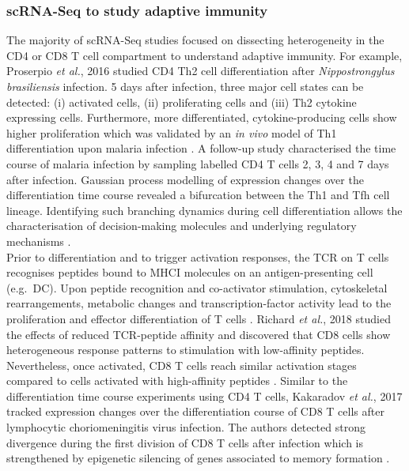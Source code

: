 \subsubsection{scRNA-Seq to study adaptive immunity}

The majority of scRNA-Seq studies focused on dissecting heterogeneity in the CD4\plus{} or CD8\plus{} T cell compartment to understand adaptive immunity. For example, Proserpio \emph{et al.}, 2016 studied CD4\plus{} Th2 cell differentiation after \textit{Nippostrongylus brasiliensis} infection. 5 days after infection, three major cell states can be detected: (i) activated cells, (ii) proliferating cells and (iii) Th2 cytokine expressing cells. Furthermore, more differentiated, cytokine-producing cells show higher proliferation which was validated by an \emph{in vivo} model of Th1 differentiation upon malaria infection \citep{Proserpio2016}. A follow-up study characterised the time course of malaria infection by sampling labelled CD4\plus{} T cells 2, 3, 4 and 7 days after infection. Gaussian process modelling of expression changes over the differentiation time course revealed a bifurcation between the Th1 and \gls{Tfh} cell lineage. Identifying such branching dynamics during cell differentiation allows the characterisation of decision-making molecules and underlying regulatory mechanisms \citep{Lonnberg2017}. \\

Prior to differentiation and to trigger activation responses, the \gls{TCR} on T cells recognises peptides bound to \gls{MHCI} molecules on an antigen-presenting cell (e.g.~DC). Upon peptide recognition and co-activator stimulation, cytoskeletal rearrangements, metabolic changes and transcription-factor activity lead to the proliferation and effector differentiation of T cells \citep{Richard2018}. Richard \emph{et al.}, 2018 studied the effects of reduced TCR-peptide affinity and discovered that CD8\plus{} cells show heterogeneous response patterns to stimulation with low-affinity peptides. Nevertheless, once activated, CD8\plus{} T cells reach similar activation stages compared to cells activated with high-affinity peptides \citep{Richard2018}. Similar to the differentiation time course experiments using CD4\plus{} T cells, Kakaradov \emph{et al.}, 2017 tracked expression changes over the differentiation course of CD8\plus{} T cells after lymphocytic choriomeningitis virus infection. The authors detected strong divergence during the first division of CD8\plus{} T cells after infection which is strengthened by epigenetic silencing of genes associated to memory formation \citep{Kakaradov2017}.\\

